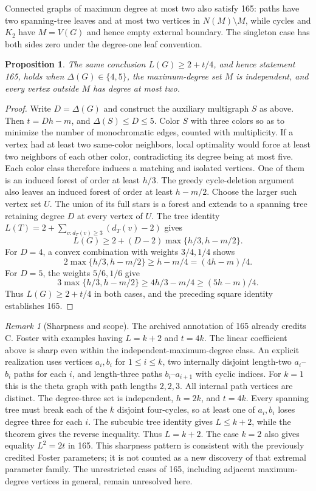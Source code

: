 \documentclass[11pt,a4paper]{article}
\newtheorem{proposition}[theorem]{Proposition}
\theoremstyle{definition}\newtheorem{definition}[theorem]{Definition}
\theoremstyle{remark}\newtheorem{remark}[theorem]{Remark}
\begin{document}
Connected graphs of maximum degree at most two also satisfy 165:
paths have two spanning-tree leaves and at most two vertices in
$N(M)\setminus M$, while cycles and $K_2$ have $M=V(G)$ and hence
empty external boundary. The singleton case has both sides zero
under the degree-one leaf convention.

\begin{proposition}\label{r12leaf:165higher}
The same conclusion $L(G)\geq2+t/4$, and hence statement 165, holds
when $\Delta(G)\in\{4,5\}$, the maximum-degree set $M$ is independent,
and every vertex outside $M$ has degree at most two.
\end{proposition}
\begin{proof}
Write $D=\Delta(G)$ and construct the auxiliary multigraph $S$ as
above. Then $t=Dh-m$, and $\Delta(S)\leq D\leq5$. Color $S$ with
three colors so as to minimize the number of monochromatic edges,
counted with multiplicity. If a vertex had at least two same-color
neighbors, local optimality would force at least two neighbors of
each other color, contradicting its degree being at most five.
Each color class therefore induces a matching and isolated vertices.
One of them is an induced forest of order at least $h/3$.
The greedy cycle-deletion argument also leaves an induced forest of
order at least $h-m/2$. Choose the larger such vertex set $U$.
The union of its full stars is a forest and extends to a spanning
tree retaining degree $D$ at every vertex of $U$. The tree identity
$L(T)=2+\sum_{v:d_T(v)\geq3}(d_T(v)-2)$ gives
\[
 L(G)\geq2+(D-2)\max\{h/3,h-m/2\}.
\]
For $D=4$, a convex combination with weights $3/4,1/4$ shows
\[
 2\max\{h/3,h-m/2\}\geq h-m/4=(4h-m)/4.
\]
For $D=5$, the weights $5/6,1/6$ give
\[
 3\max\{h/3,h-m/2\}\geq4h/3-m/4
 \geq(5h-m)/4.
\]
Thus $L(G)\geq2+t/4$ in both cases, and the preceding square
identity establishes 165.
\end{proof}

\begin{remark}[Sharpness and scope]
The archived annotation of 165 already credits C. Foster with examples
having $L=k+2$ and $t=4k$. The linear coefficient above is sharp even
within the independent-maximum-degree class. An explicit realization
uses vertices $a_i,b_i$ for $1\leq i\leq k$, two internally disjoint
length-two $a_i$--$b_i$ paths for each $i$, and length-three paths
$b_i$--$a_{i+1}$ with cyclic indices. For $k=1$ this is the theta
graph with path lengths $2,2,3$. All internal path vertices are
distinct. The degree-three set is independent, $h=2k$, and $t=4k$.
Every spanning tree must break each of the $k$ disjoint four-cycles,
so at least one of $a_i,b_i$ loses degree three for each $i$.
The subcubic tree identity gives $L\leq k+2$, while the theorem gives
the reverse inequality. Thus $L=k+2$. The case $k=2$ also gives
equality $L^2=2t$ in 165.
This sharpness pattern is consistent with the previously credited
Foster parameters; it is not counted as a new discovery of that
extremal parameter family. The unrestricted cases of 165, including
adjacent maximum-degree vertices in general, remain unresolved here.
\end{remark}
\end{document}
